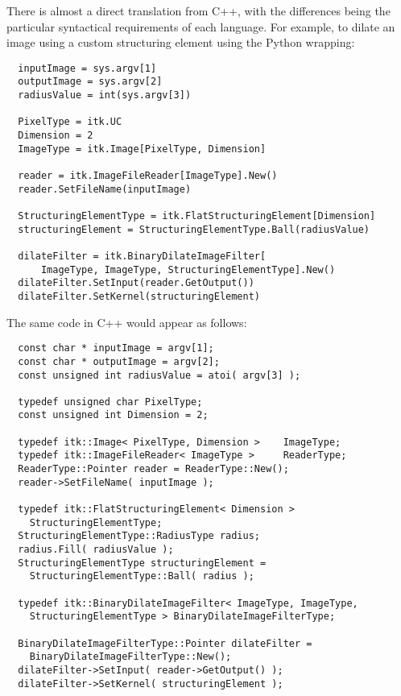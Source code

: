There is almost a direct translation from C++, with the differences being the
particular syntactical requirements of each language. For example, to dilate an
image using a custom structuring element using the Python wrapping:

\small
\begin{verbatim}
  inputImage = sys.argv[1]
  outputImage = sys.argv[2]
  radiusValue = int(sys.argv[3])

  PixelType = itk.UC
  Dimension = 2
  ImageType = itk.Image[PixelType, Dimension]

  reader = itk.ImageFileReader[ImageType].New()
  reader.SetFileName(inputImage)

  StructuringElementType = itk.FlatStructuringElement[Dimension]
  structuringElement = StructuringElementType.Ball(radiusValue)

  dilateFilter = itk.BinaryDilateImageFilter[
      ImageType, ImageType, StructuringElementType].New()
  dilateFilter.SetInput(reader.GetOutput())
  dilateFilter.SetKernel(structuringElement)
\end{verbatim}
\normalsize
The same code in C++ would appear as follows:

\small
\begin{verbatim}
  const char * inputImage = argv[1];
  const char * outputImage = argv[2];
  const unsigned int radiusValue = atoi( argv[3] );

  typedef unsigned char PixelType;
  const unsigned int Dimension = 2;

  typedef itk::Image< PixelType, Dimension >    ImageType;
  typedef itk::ImageFileReader< ImageType >     ReaderType;
  ReaderType::Pointer reader = ReaderType::New();
  reader->SetFileName( inputImage );

  typedef itk::FlatStructuringElement< Dimension >
    StructuringElementType;
  StructuringElementType::RadiusType radius;
  radius.Fill( radiusValue );
  StructuringElementType structuringElement =
    StructuringElementType::Ball( radius );

  typedef itk::BinaryDilateImageFilter< ImageType, ImageType,
    StructuringElementType > BinaryDilateImageFilterType;

  BinaryDilateImageFilterType::Pointer dilateFilter =
    BinaryDilateImageFilterType::New();
  dilateFilter->SetInput( reader->GetOutput() );
  dilateFilter->SetKernel( structuringElement );
\end{verbatim}
\normalsize

